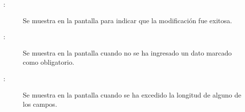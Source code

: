 	
\begin{description}

	\item[ :] Se muestra en la pantalla  para indicar que la modificación fue exitosa.
	\item[ :] Se muestra en la pantalla  cuando no se ha ingresado un dato marcado como obligatorio.
	\item[ :] Se muestra en la pantalla  cuando se ha excedido la longitud de alguno de los campos.	
\end{description}
